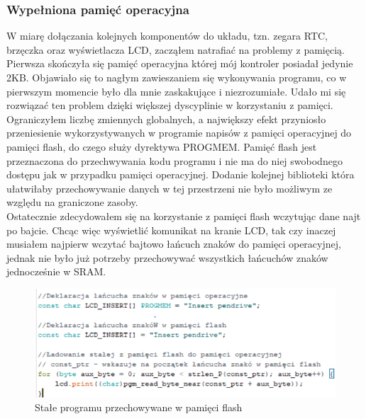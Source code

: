 \documentclass[declaration,shortabstract, mgr]{iithesis}
\begin{document}
\subsubsection{Wypełniona pamięć operacyjna}
\indent W miarę dołączania kolejnych komponentów do układu, tzn. zegara RTC, brzęczka oraz wyświetlacza LCD, zacząłem natrafiać na problemy z pamięcią. \\
\indent Pierwsza skończyła się pamięć operacyjna której mój kontroler posiadał jedynie 2KB. Objawiało się to nagłym zawieszaniem się wykonywania programu, co w pierwszym momencie było dla mnie zaskakujące i niezrozumiałe.
\indent Udało mi się rozwiązać ten problem dzięki większej dyscyplinie w korzystaniu z pamięci. Ograniczyłem liczbę zmiennych globalnych, a największy efekt przyniosło przeniesienie wykorzystywanych w programie napisów z pamięci operacyjnej do pamięci flash, do czego służy dyrektywa PROGMEM.
\indent Pamięć flash jest przeznaczona do przechwywania kodu programu i nie ma do niej swobodnego dostępu jak w przypadku pamięci operacyjnej. Dodanie kolejnej biblioteki która ułatwiłaby przechowywanie danych w tej przestrzeni nie było możliwym ze względu na graniczone zasoby.\\
\indent Ostatecznie zdecydowałem się na korzystanie z pamięci flash wczytując dane najt po bajcie. Chcąc więc wyświetlić komunikat na kranie LCD, tak czy inaczej musiałem najpierw wczytać bajtowo łańcuch znaków do pamięci operacyjnej, jednak nie było już potrzeby przechowywać wszystkich łańcuchów znaków jednocześnie w SRAM.
 \begin{figure}[h]
\caption{Stałe programu przechowywane w pamięci flash}
\centering
\includegraphics[scale=0.8]{progmem.png}
\end{figure}
\end{document}
